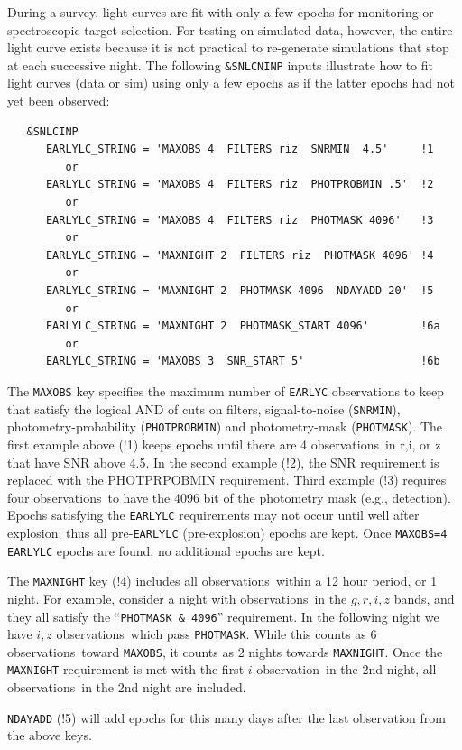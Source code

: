 \documentclass[12pt]{article}
\newcommand{\obs}{observation}
\newcommand{\obss}{observations}
\begin{document}
During a survey, light curves are fit with only a few epochs 
for monitoring or spectroscopic target selection.
For testing on simulated data, however, the entire light curve 
exists because it is not  practical to re-generate simulations
that stop at each successive night.
The following {\tt \&SNLCNINP} inputs illustrate how to 
fit light curves (data or sim) using only a few epochs
as if the latter epochs had not yet been observed:
%
\begin{verbatim}
   &SNLCINP
      EARLYLC_STRING = 'MAXOBS 4  FILTERS riz  SNRMIN  4.5'     !1
         or
      EARLYLC_STRING = 'MAXOBS 4  FILTERS riz  PHOTPROBMIN .5'  !2 
         or
      EARLYLC_STRING = 'MAXOBS 4  FILTERS riz  PHOTMASK 4096'   !3
         or 
      EARLYLC_STRING = 'MAXNIGHT 2  FILTERS riz  PHOTMASK 4096' !4
         or
      EARLYLC_STRING = 'MAXNIGHT 2  PHOTMASK 4096  NDAYADD 20'  !5
         or
      EARLYLC_STRING = 'MAXNIGHT 2  PHOTMASK_START 4096'        !6a
         or
      EARLYLC_STRING = 'MAXOBS 3  SNR_START 5'                  !6b
\end{verbatim}
%
The {\tt MAXOBS} key specifies the maximum number of 
{\tt EARLYC} observations to keep that satisfy the logical 
AND of cuts on 
filters, 
signal-to-noise ({\tt SNRMIN}),
photometry-probability ({\tt PHOTPROBMIN}) and 
photometry-mask ({\tt PHOTMASK}).
The first example above (!1) keeps epochs until there are 4 \obss\
in r,i, or z that have SNR above 4.5. 
In the second example (!2), the SNR requirement is replaced with the 
PHOTPRPOBMIN requirement. Third example (!3) requires four \obss\
to have the 4096 bit of the photometry mask (e.g., detection).
Epochs satisfying the {\tt EARLYLC} requirements may not 
occur until well after explosion; thus all pre-{\tt EARLYLC} (pre-explosion) 
epochs are kept. Once {\tt MAXOBS=4} {\tt EARLYLC} epochs are 
found, no additional epochs are kept. 

The {\tt MAXNIGHT} key (!4) includes all \obss\ within a 
12 hour period, or 1 night. For example, consider a night with \obss\ 
in the $g,r,i,z$ bands, and they all satisfy the ``{\tt PHOTMASK \& 4096}''
requirement. In the following night we have $i,z$ \obss\
which pass {\tt PHOTMASK}.
While this counts as 6 \obss\ toward {\tt MAXOBS}, it counts
as 2 nights towards {\tt MAXNIGHT}. Once the {\tt MAXNIGHT}
requirement is met with the first $i$-\obs\ in the 2nd night, 
all \obss\ in the 2nd night are included.

{\tt NDAYADD} (!5) will add epochs for this many days
after the last observation from the above keys.
\end{document}
